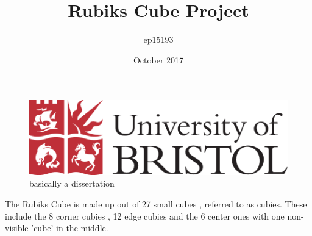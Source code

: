 \documentclass{article}
\author{ep15193}
\title{Rubiks Cube Project}\vspace{-50pt}
\date{October 2017}
\begin{document}
\maketitle
\begin{figure}[h]
\centering
\includegraphics[scale=.5]{uob.png}
\caption{basically a dissertation}
\end{figure}
\newpage
\tableofcontents
\newpage

\medskip
The Rubiks Cube is made up out of 27 small cubes , referred to as cubies. These include the 8 corner cubies , 12 edge cubies and the 6 center ones with one non-visible 'cube' in the middle.
\begin{figure}[h]
{
	\hspace{-10cm}
}
\end{figure}
\vspace{40pt}
\end{document}
